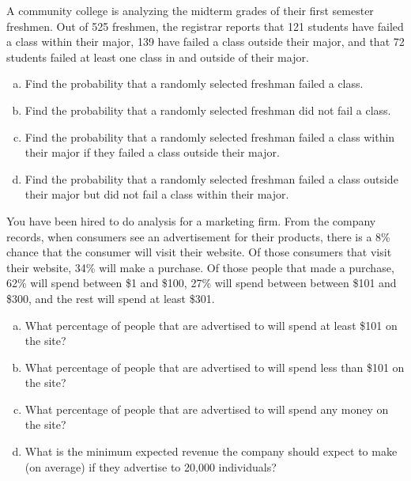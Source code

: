 \documentclass[11pt,letterpaper]{article}
\begin{document}
\newpage



 A community college is analyzing the midterm grades of their first semester freshmen. Out of 525 freshmen, the registrar reports that 121 students have failed a class within their major, 139 have failed a class outside their major, and that 72 students failed at least one class in and outside of their major. 
	\begin{enumerate}[(a)]
	\item Find the probability that a randomly selected freshman failed a class. 
	\item Find the probability that a randomly selected freshman did not fail a class.
	\item Find the probability that a randomly selected freshman failed a class within their major if they failed a class outside their major. 
	\item Find the probability that a randomly selected freshman failed a class outside their major but did not fail a class within their major. 
	\end{enumerate}



\newpage



 You have been hired to do analysis for a marketing firm. From the company records, when consumers see an advertisement for their products, there is a 8\% chance that the consumer will visit their website. Of those consumers that visit their website, 34\% will make a purchase. Of those people that made a purchase, 62\% will spend between \$1 and \$100, 27\% will spend between between \$101 and \$300, and the rest will spend at least \$301. 
	\begin{enumerate}[(a)]
	\item What percentage of people that are advertised to will spend at least \$101 on the site?
	\item What percentage of people that are advertised to will spend less than \$101 on the site?
	\item What percentage of people that are advertised to will spend any money on the site?
	\item What is the minimum expected revenue the company should expect to make (on average) if they advertise to 20,000 individuals? 
	\end{enumerate}
\end{document}
